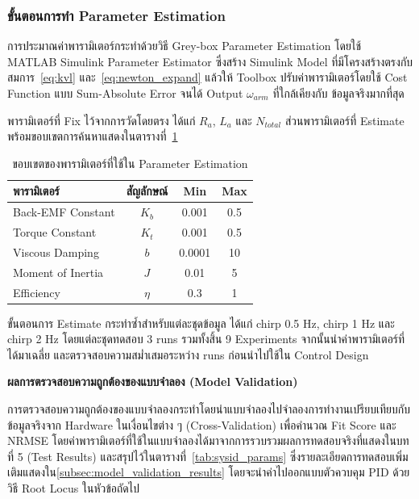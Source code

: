\subsubsection{ขั้นตอนการทำ Parameter Estimation}
\label{subsubsec:parameter_estimation}

การประมาณค่าพารามิเตอร์กระทำด้วยวิธี Grey-box Parameter Estimation
โดยใช้ MATLAB Simulink Parameter Estimator ซึ่งสร้าง Simulink Model
ที่มีโครงสร้างตรงกับสมการ~\eqref{eq:kvl} และ~\eqref{eq:newton_expand}
แล้วให้ Toolbox ปรับค่าพารามิเตอร์โดยใช้ Cost Function แบบ
Sum-Absolute Error จนได้ Output $\omega_{arm}$ ที่ใกล้เคียงกับ
ข้อมูลจริงมากที่สุด

พารามิเตอร์ที่ Fix ไว้จากการวัดโดยตรง ได้แก่ $R_a$, $L_a$ และ $N_{total}$
ส่วนพารามิเตอร์ที่ Estimate พร้อมขอบเขตการค้นหาแสดงในตารางที่~\ref{tab:param_bounds}

\begin{table}[h]
\centering
\caption{ขอบเขตของพารามิเตอร์ที่ใช้ใน Parameter Estimation}
\label{tab:param_bounds}
\begin{tabular}{lccc}
\hline
พารามิเตอร์ & สัญลักษณ์ & Min & Max \\
\hline
Back-EMF Constant   & $K_b$  & 0.001 & 0.5 \\
Torque Constant     & $K_t$  & 0.001 & 0.5 \\
Viscous Damping     & $b$    & 0.0001 & 10 \\
Moment of Inertia   & $J$    & 0.01 & 5 \\
Efficiency          & $\eta$ & 0.3 & 1 \\
\hline
\end{tabular}
\end{table}

ขั้นตอนการ Estimate กระทำซ้ำสำหรับแต่ละชุดข้อมูล ได้แก่
chirp 0.5 Hz, chirp 1 Hz และ chirp 2 Hz โดยแต่ละชุดทดสอบ 3 runs
รวมทั้งสิ้น 9 Experiments จากนั้นนำค่าพารามิเตอร์ที่ได้มาเฉลี่ย
และตรวจสอบความสม่ำเสมอระหว่าง runs ก่อนนำไปใช้ใน
Control Design

\textbf{ผลการตรวจสอบความถูกต้องของแบบจำลอง (Model Validation)}

การตรวจสอบความถูกต้องของแบบจำลองกระทำโดยนำแบบจำลองไปจำลองการทำงานเปรียบเทียบกับข้อมูลจริงจาก Hardware ในเงื่อนไขต่าง ๆ (Cross-Validation) เพื่อคำนวณ Fit Score และ NRMSE โดยค่าพารามิเตอร์ที่ใช้ในแบบจำลองได้มาจากการรวบรวมผลการทดสอบจริงที่แสดงในบทที่ 5 (Test Results) และสรุปไว้ในตารางที่~\ref{tab:sysid_params} ซึ่งรายละเอียดการทดสอบเพิ่มเติมแสดงใน\cref{subsec:model_validation_results}
โดยจะนำค่าไปออกแบบตัวควบคุม PID ด้วยวิธี Root Locus ในหัวข้อถัดไป

